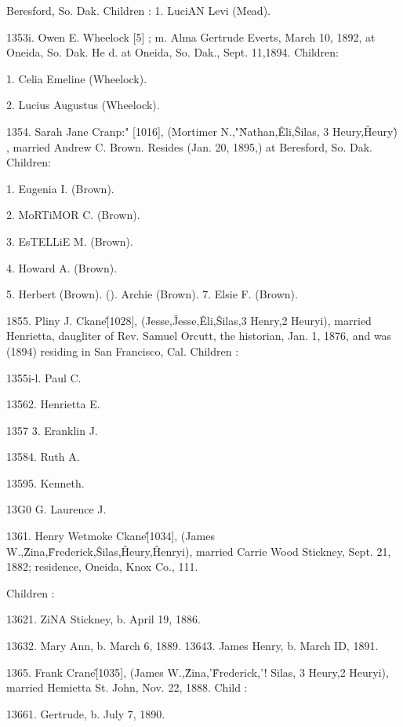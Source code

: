 Beresford, So. Dak. Children : 
1. LuciAN Levi (Mead). 

1353i. Owen E. Wheelock [5] ; m. Alma Gertrude Everts, March 10, 
1892, at Oneida, So. Dak. He d. at Oneida, So. Dak., Sept. 
11,1894. Children: 

1. Celia Emeline (Wheelock). 

2. Lucius Augustus (Wheelock). 

1354. Sarah Jane Cranp:" [1016], (Mortimer N.,"\^ Nathan,\^ 
Eli,\^ Silas, 3 Heury,\^ Heury\^) , married Andrew C. Brown. Resides 
(Jan. 20, 1895,) at Beresford, So. Dak. Children: 

1. Eugenia I. (Brown). 

2. MoRTiMOR C. (Brown). 

3. EsTELLiE M. (Brown). 

4. Howard A. (Brown). 

5. Herbert (Brown). 
(). Archie (Brown). 
7. Elsie F. (Brown). 

1855. Pliny J. Ckane\^ [1028], (Jesse,\^ Jesse,\^ Eli,\^ Silas,3 
Henry,2 Heuryi), married Henrietta, daugliter of Rev. Samuel 
Orcutt, the historian, Jan. 1, 1876, and was (1894) residing in 
San Francisco, Cal. Children : 

1355i-l. Paul C. 

13562. Henrietta E. 

1357  3. Eranklin J. 

13584. Ruth A. 

13595. Kenneth. 

13G0 G. Laurence J. 

1361. Henry Wetmoke Ckane\^ [1034], (James W.,\^ Zina,\^ 
Frederick,\^ Silas,\^ Heury,\^ Henryi), married Carrie Wood 
Stickney, Sept. 21, 1882; residence, Oneida, Knox Co., 111. 

Children : 

13621. ZiNA Stickney, b. April 19, 1886. 




13632. Mary Ann, b. March 6, 1889. 
13643. James Henry, b. March ID, 1891. 

1365. Frank Crane\^ [1035], (James W.,\^ Zina,'\^ Frederick,'! 
Silas, 3 Heury,2 Heuryi), married Hemietta St. John, Nov. 22, 
1888. Child : 

13661. Gertrude, b. July 7, 1890. 

